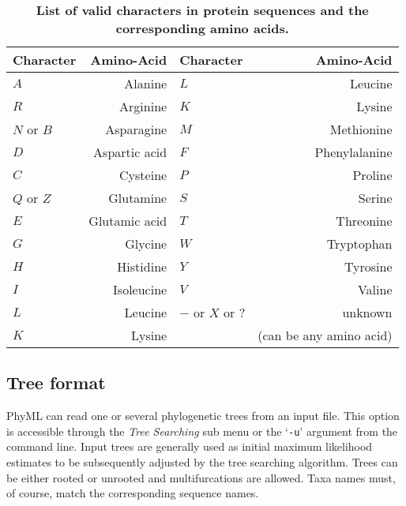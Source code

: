 \documentclass[a4paper,12pt]{article}
\newcommand{\x}[1]{\texttt{#1}}
\begin{document}
\begin{table}
\begin{center}
\begin{tabular}{lr|lr}
\hline
Character & Amino-Acid & Character & Amino-Acid \\
\hline
$A$       & Alanine &         $L$       & Leucine \\             
$R$       & Arginine &        $K$       & Lysine \\              
$N$ or $B$& Asparagine &      $M$       & Methionine \\          
$D$       & Aspartic acid &   $F$       & Phenylalanine \\       
$C$       & Cysteine &        $P$       & Proline \\             
$Q$ or $Z$& Glutamine &       $S$       & Serine \\              
$E$       & Glutamic acid &   $T$       & Threonine \\           
$G$       & Glycine &         $W$       & Tryptophan \\          
$H$       & Histidine &       $Y$       & Tyrosine \\            
$I$       & Isoleucine &      $V$       & Valine \\              
$L$       & Leucine &         $-$ or $X$ or $?$ & unknown \\     
$K$       & Lysine &          & (can be any amino acid) \\       
\hline
\end{tabular}
\end{center}
\caption{{\bf List of valid characters in protein sequences and the corresponding amino acids.}}\label{tab:ambigu_aa}
\end{table}

\subsection{Tree format}

PhyML can  read one or  several phylogenetic trees  from an input  file.  This option  is accessible
through the  {\em Tree Searching} sub  menu or the `\x{-u}'  argument from the  command line.  Input
trees are generally used as initial maximum  likelihood estimates to be subsequently adjusted by the
tree searching algorithm.   Trees can be either rooted or unrooted  and multifurcations are allowed.
Taxa names must, of course, match the corresponding sequence names.
\end{document}
